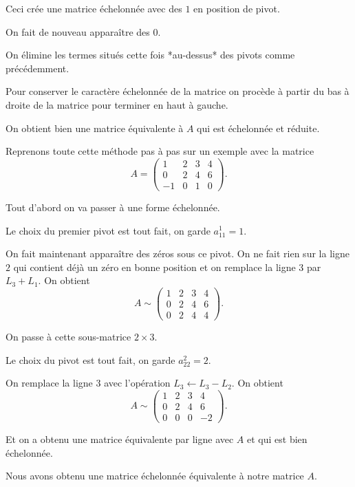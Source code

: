 \change
Ceci crée une matrice échelonnée avec des $1$ en position de pivot.

\change
On fait de nouveau apparaître des $0$.

\change
On élimine les termes situés cette fois *au-dessus* des pivots comme précédemment.

Pour conserver le caractère échelonnée de la matrice on procède 
à partir du bas à droite de la matrice pour terminer en haut à gauche. 


\change
On obtient bien une matrice équivalente à $A$ qui est échelonnée et réduite.



\diapo


Reprenons toute cette méthode pas à pas sur un exemple avec la matrice
$$A=\begin{pmatrix}1&2&3&4\\
0&2&4&6\\
-1&0&1&0
\end{pmatrix}.$$

\change
Tout d'abord on va passer à une forme échelonnée.

\change
Le choix du premier pivot est tout fait, 
on garde $a_{11}^1=1$.

\change
On fait maintenant apparaître des zéros sous ce pivot.
On ne fait rien sur la ligne $2$ qui contient 
déjà un zéro en bonne position et on remplace la ligne 3 par $L_3 + L_1$. 
On obtient 
$$A\sim\begin{pmatrix}1&2&3&4\\
0&2&4&6\\
0&2&4&4
\end{pmatrix}.$$

\change
On passe à cette sous-matrice $2\times 3$.

Le choix du pivot est tout fait, on garde $a^2_{22}=2$.

\change
On remplace  la ligne $3$ avec
l'opération $L_3 \leftarrow L_3 - L_2$. On obtient
$$A\sim\begin{pmatrix}1&2&3&4\\
0&2&4&6\\
0&0&0&-2
\end{pmatrix}.$$

\change
Et on a obtenu une matrice équivalente par ligne avec $A$ et qui est bien échelonnée.

\diapo

Nous avons obtenu une matrice échelonnée équivalente à notre matrice $A$.

